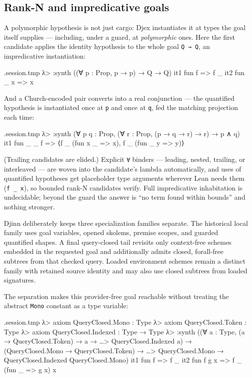 \documentclass[11pt,oneside]{article}
\newcommand{\code}[1]{\texttt{#1}}
\newenvironment{session}
 {\VerbatimEnvironment\begin{VerbatimOut}{\jobname.session.tmp}}
 {\end{VerbatimOut}%
  \begin{sessionouter}%
  \VerbatimInput[fontsize=\footnotesize, breaklines=true,
    breaksymbolleft={\textcolor{stone}{\footnotesize$\hookrightarrow$}},
    formatcom=\color{ink}, tabsize=4]{\jobname.session.tmp}%
  \end{sessionouter}}
\begin{document}
\subsection{Rank-N and impredicative goals}\label{sec:rankn}

A polymorphic hypothesis is not just cargo: Djex instantiates it at
types the goal itself supplies --- including, under a guard, at
\emph{polymorphic} ones. Here the first candidate applies the
identity hypothesis to the whole goal \code{Q → Q}, an impredicative
instantiation:

\begin{session}
λ> :synth ((∀ p : Prop, p → p) → Q → Q)
  it1  fun f => f _
  it2  fun _ x => x
\end{session}

And a Church-encoded pair converts into a real conjunction --- the
quantified hypothesis is instantiated once at \code{p} and once at
\code{q}, fed the matching projection each time:

\begin{session}
λ> :synth (∀ p q : Prop, (∀ r : Prop, (p → q → r) → r) → p ∧ q)
  it1  fun _ _ f => ⟨f _ (fun x _ => x), f _ (fun _ y => y)⟩
\end{session}

(Trailing candidates are elided.) Explicit \code{∀} binders ---
leading, nested, trailing, or
interleaved --- are woven into the candidate's lambda automatically,
and uses of quantified hypotheses get placeholder type arguments
wherever Lean needs them (\code{f \_ x}), so bounded rank-N
candidates verify. Full impredicative inhabitation is undecidable;
beyond the guard the answer is ``no term found within bounds'' and
nothing stronger.

Djinn deliberately keeps three specialization families separate. The
historical local family uses goal variables, opened skolems, premise scopes,
and guarded quantified shapes. A final query-closed tail revisits only
context-free schemes embedded in the requested goal and additionally admits
closed, forall-free subtrees from that checked query. Loaded environment
schemes remain a distinct family with retained source identity and may also use
closed subtrees from loaded signatures.

The separation makes this provider-free goal reachable without treating the
abstract \code{Mono} constant as a type variable:

\begin{session}
λ> axiom QueryClosed.Mono : Type
λ> axiom QueryClosed.Token : Type
λ> axiom QueryClosed.Indexed : Type → Type
λ> :synth ((∀ a : Type, (a → QueryClosed.Token) → a →
…>     QueryClosed.Indexed a) → (QueryClosed.Mono → QueryClosed.Token) →
…>     QueryClosed.Mono → QueryClosed.Indexed QueryClosed.Mono)
  it1  fun f => f _
  it2  fun f g x => f _ (fun _ => g x) x
\end{session}
\end{document}
